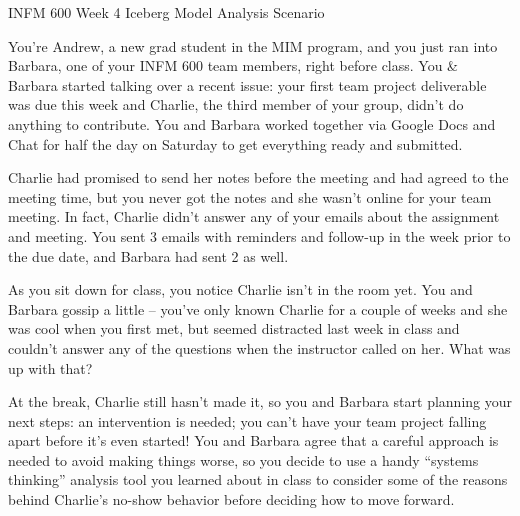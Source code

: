 \documentclass[]{article}
\date{}
\begin{document}
INFM 600 Week 4 Iceberg Model Analysis Scenario

You're Andrew, a new grad student in the MIM program, and you just ran
into Barbara, one of your INFM 600 team members, right before class. You
\& Barbara started talking over a recent issue: your first team project
deliverable was due this week and Charlie, the third member of your
group, didn't do anything to contribute. You and Barbara worked together
via Google Docs and Chat for half the day on Saturday to get everything
ready and submitted.

Charlie had promised to send her notes before the meeting and had agreed
to the meeting time, but you never got the notes and she wasn't online
for your team meeting. In fact, Charlie didn't answer any of your emails
about the assignment and meeting. You sent 3 emails with reminders and
follow-up in the week prior to the due date, and Barbara had sent 2 as
well.

As you sit down for class, you notice Charlie isn't in the room yet. You
and Barbara gossip a little -- you've only known Charlie for a couple of
weeks and she was cool when you first met, but seemed distracted last
week in class and couldn't answer any of the questions when the
instructor called on her. What was up with that?

At the break, Charlie still hasn't made it, so you and Barbara start
planning your next steps: an intervention is needed; you can't have your
team project falling apart before it's even started! You and Barbara
agree that a careful approach is needed to avoid making things worse, so
you decide to use a handy ``systems thinking'' analysis tool you learned
about in class to consider some of the reasons behind Charlie's no-show
behavior before deciding how to move forward.
\end{document}
